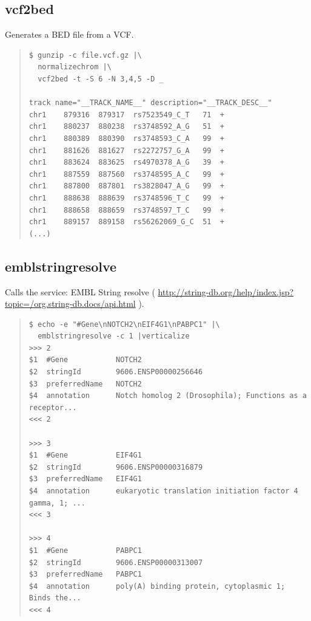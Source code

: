 \documentclass[12pt]{article}
\begin{document}
\subsection{vcf2bed}
Generates a BED file from a VCF.
\begin{quote}
\begin{verbatim}
$ gunzip -c file.vcf.gz |\
  normalizechrom |\
  vcf2bed -t -S 6 -N 3,4,5 -D _

track name="__TRACK_NAME__" description="__TRACK_DESC__" 
chr1	879316	879317	rs7523549_C_T	71	+
chr1	880237	880238	rs3748592_A_G	51	+
chr1	880389	880390	rs3748593_C_A	99	+
chr1	881626	881627	rs2272757_G_A	99	+
chr1	883624	883625	rs4970378_A_G	39	+
chr1	887559	887560	rs3748595_A_C	99	+
chr1	887800	887801	rs3828047_A_G	99	+
chr1	888638	888639	rs3748596_T_C	99	+
chr1	888658	888659	rs3748597_T_C	99	+
chr1	889157	889158	rs56262069_G_C	51	+
(...)
\end{verbatim}
\end{quote}

\subsection{emblstringresolve}
Calls the service: EMBL String resolve ( \url{http://string-db.org/help/index.jsp?topic=/org.string-db.docs/api.html} ).
\begin{quote}
\begin{verbatim}
$ echo -e "#Gene\nNOTCH2\nEIF4G1\nPABPC1" |\
  emblstringresolve -c 1 |verticalize 
>>>	2
$1	#Gene        	NOTCH2
$2	stringId     	9606.ENSP00000256646
$3	preferredName	NOTCH2
$4	annotation   	Notch homolog 2 (Drosophila); Functions as a receptor...
<<<	2

>>>	3
$1	#Gene        	EIF4G1
$2	stringId     	9606.ENSP00000316879
$3	preferredName	EIF4G1
$4	annotation   	eukaryotic translation initiation factor 4 gamma, 1; ...
<<<	3

>>>	4
$1	#Gene        	PABPC1
$2	stringId     	9606.ENSP00000313007
$3	preferredName	PABPC1
$4	annotation   	poly(A) binding protein, cytoplasmic 1; Binds the...
<<<	4
\end{verbatim}
\end{quote}
\end{document}
